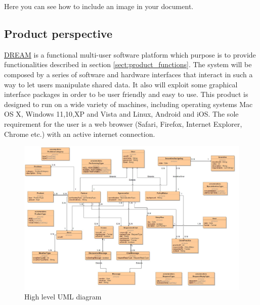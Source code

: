 Here you can see how to include an image in your document.


\subsection{Product perspective}
\hyperref[tab:acronymsTable]{DREAM} is a functional multi-user software platform which purpose is to provide functionalities described in section \ref{sect:product_functions}. The system will be composed by a series of software and hardware interfaces that interact in such a way to let users manipulate shared data. It also will exploit some graphical interface packages in order to be user friendly and easy to use.
This product is designed to run on a wide variety of machines, including operating systems Mac OS X, Windows 11,10,XP and Vista and Linux, Android and iOS. The sole requirement for the user is a web browser (Safari, Firefox, Internet Explorer, Chrome etc.) with an active internet connection.

\begin{figure}[H]
	\centering
    \includegraphics[page=1, width=\textwidth]{Images/uml_draft.JPG}
	\caption{\label{fig:uml_class_diagram}High level UML diagram}
\end{figure}

